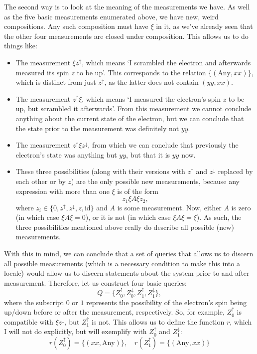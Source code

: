 \documentclass{article}
\theoremstyle{definition}
\theoremstyle{plain}
\newcommand{\id}{\mathrm{id}}
\begin{document}
The second way is to look at the meaning of the measurements we have. As well as the five basic measurements enumerated above, we have new, weird compositions. Any such composition must have $\xi$ in it, as we've already seen that the other four measurements are closed under composition. This allows us to do things like:
\begin{itemize}
\item The measurement $\xi z^\uparrow$, which means `I scrambled the electron and afterwards measured its spin $z$ to be up'. This corresponds to the relation $\{(\text{Any}, xx)\}$, which is distinct from just $z^\uparrow$, as the latter does not contain $(yy,xx)$.

\item The measurement $z^\uparrow \xi$, which means `I measured the electron's spin $z$ to be up, but scrambled it afterwards'. From this measurement we cannot conclude anything about the current state of the electron, but we can conclude that the state prior to the measurement was definitely not $yy$.

\item The measurement $z^\uparrow \xi z^\downarrow$, from which we can conclude that previously the electron's state was anything but $yy$, but that it is $yy$ now.

\item These three possibilities (along with their versions with $z^\uparrow$ and $z^\downarrow$ replaced by each other or by $z$) are the only possible new measurements, because any expression with more than one $\xi$ is of the form
\begin{equation}
z_1 \xi A \xi z_2,
\end{equation}
where $z_i \in \{0,z^\uparrow,z^\downarrow,z, \id\}$ and $A$ is some measurement. Now, either $A$ is zero (in which case $\xi A \xi = 0$), or it is not (in which case $\xi A \xi = \xi$). As such, the three possibilities mentioned above really do describe all possible (new) measurements.
\end{itemize}

With this in mind, we can conclude that a set of queries that allows us to discern all possible measurements (which is a necessary condition to make this into a locale) would allow us to discern statements about the system prior to and after measurement. Therefore, let us construct four basic queries:
\begin{equation}
Q = \{Z^\uparrow_0, Z^\downarrow_0, Z^\uparrow_1, Z^\downarrow_1\},
\end{equation}
where the subscript $0$ or $1$ represents the possibility of the electron's spin being up/down before or after the measurement, respectively. So, for example, $Z^\uparrow_0$ is compatible with $\xi z^\downarrow$, but $Z^\uparrow_1$ is not. This allows us to define the function $r$, which I will not do explicitly, but will exemplify with $Z^\uparrow_0$ and $Z^\downarrow_1$:
\begin{equation}
r(Z^\uparrow_0) = \{(xx, \text{Any})\}, \quad r(Z^\uparrow_1) = \{(\text{Any}, xx)\}
\end{equation}
\end{document}
